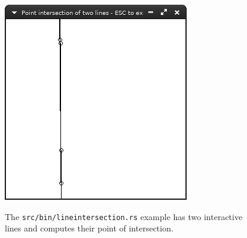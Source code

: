 \documentclass[12pt,openany,a4,usenames,dvipsnames]{book}
\DeclareRobustCommand{\Caption}[1]{\par%
  \vspace{1em}
  {\noindent{}#1}}
\begin{document}
\begin{figure}[H]
\begin{minipage}{0.49\textwidth}
    \includegraphics[width=\textwidth,keepaspectratio]{figures/lineintersection2.png}
  \end{minipage}
  \Caption{The \texttt{src/bin/lineintersection.rs} example has two interactive lines and computes their point of intersection.}
\end{figure}
%
%
%
%
\end{document}
